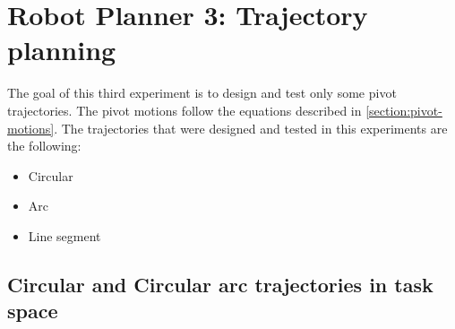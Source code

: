 \section{Robot Planner 3: Trajectory planning}

The goal of this third experiment is to design and test only some pivot trajectories. The pivot motions follow the equations described in 
\ref{section:pivot-motions}. The trajectories that were designed and tested in this experiments are the following:
\begin{itemize}
\item Circular
\item Arc
\item Line segment
\end{itemize}

\subsection{Circular and Circular arc trajectories in task space}

